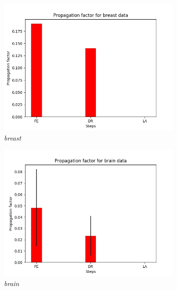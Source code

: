 \begin{figure}[H]
\centering
\begin{subfigure}{.5\textwidth}
  \centering
  \includegraphics[scale=0.4]{img/EP/propagation_factor_random_pipeline_breast}
  \caption{\textit{breast}}
  \label{fig:sfig1}
\end{subfigure}%
\begin{subfigure}{.5\textwidth}
  \centering
  \includegraphics[scale=0.4]{img/EP/propagation_factor_random_pipeline_brain}
  \caption{\textit{brain}}
  \label{fig:sfig2}
\end{subfigure}
\begin{subfigure}{.5\textwidth}
  \centering

\end{subfigure}
\end{figure}
